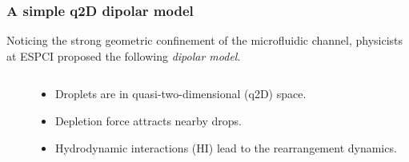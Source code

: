 \begin{frame}
  \frametitle{A simple q2D dipolar model}

  Noticing the strong geometric confinement of the microfluidic channel, physicists at ESPCI proposed the following \emph{dipolar model}.

  \begin{columns}[T]
    
    \begin{column}{0.45\textwidth}
      \centering
    \end{column}

    \pause

    \begin{column}{0.45\textwidth}
      
      \begin{bluecolorbox}
        \begin{itemize}
        \item Droplets are in quasi-two-dimensional (q2D) space.
        \item Depletion force attracts nearby drops.
        \item Hydrodynamic interactions (HI) lead to the rearrangement dynamics.
        \end{itemize}
      \end{bluecolorbox}


\end{column}
\end{columns}
\end{frame}
